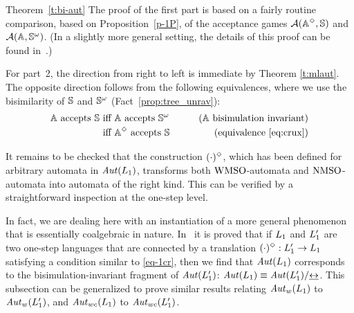 \begin{proofof}{Theorem~\ref{t:bi-aut}}
The proof of the first part is based on a fairly routine comparison, based on
Proposition~\ref{p-1P}, of the acceptance games $\mathcal{A}(\mathbb{A}^{\Diamond},\mathbb{S})$
and $\mathcal{A}(\mathbb{A},\mathbb{S}^{\omega})$.
(In a slightly more general setting, the details of this proof can be found 
in~\cite{Venxx}.)

For part~2, the direction from right to left is immediate by Theorem \ref{t:mlaut}.
The opposite direction follows from the following equivalences, where we use
the bisimilarity of $\mathbb{S}$ and $\mathbb{S}^{\omega}$ (Fact~\ref{prop:tree_unrav}):
\begin{align*}
\bbA \text{ accepts } \bbS
  & \text{ iff } \bbA \text{ accepts } \bbS^{\om}
  & \tag{$\bbA$ bisimulation invariant}
\\ & \text{ iff } \bbA^{\tmod} \text{ accepts } \bbS
  & \tag{equivalence~\eqref{eq:crux}}
\end{align*}

It remains to be checked that the construction $(\cdot )^{\Diamond}$, which has
been defined for arbitrary automata in $\mathit{Aut}(L_{1})$, transforms 
both $\mathrm{WMSO}$-automata and $\mathrm{NMSO}$-automata into automata of the right kind.
This can be verified by a straightforward inspection at the one-step level.
\end{proofof}

\begin{remark}{\rm
In fact, we are dealing here with an instantiation of a more general phenomenon 
that is essentially coalgebraic in nature.
In~\cite{Venxx} it is proved that if $L_{1}$ and $L_{1}'$ are two one-step
languages that are connected by a translation $(\cdot )^{\Diamond}: L_{1}' \to 
L_{1}$ satisfying a condition similar to \eqref{eq-1cr}, then we find that 
$\mathit{Aut}(L_{1})$ corresponds to the bisimulation-invariant fragment of 
$\mathit{Aut}(L_{1}')$: $\mathit{Aut}(L_{1}) \equiv \mathit{Aut}(L_{1}')/{\mathrel{\underline{\leftrightarrow}}}$.
This subsection can be generalized to prove similar results relating
$\mathit{Aut}_{w}(L_{1})$ to $\mathit{Aut}_{w}(L_{1}')$, and $\mathit{Aut}_{wc}(L_{1})$ to 
$\mathit{Aut}_{wc}(L_{1}')$.
}\end{remark}
